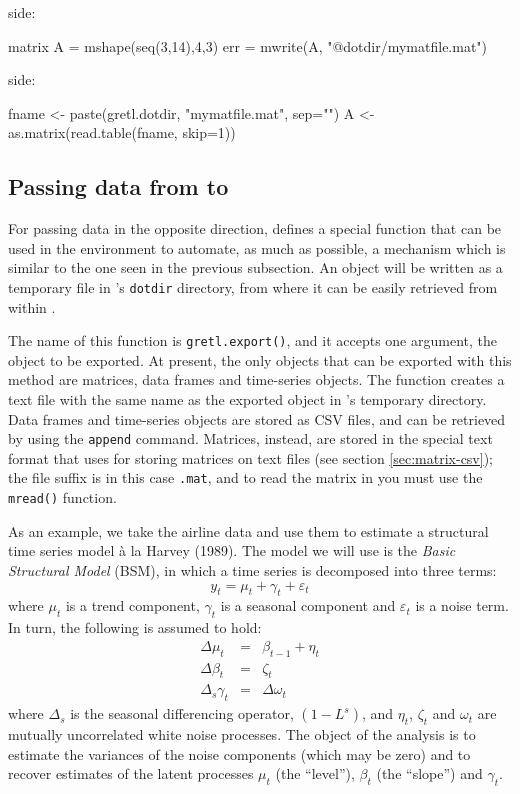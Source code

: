  side:
\begin{code}
  matrix A = mshape(seq(3,14),4,3)
  err = mwrite(A, "@dotdir/mymatfile.mat")
\end{code}
 side:
\begin{code}
  fname <- paste(gretl.dotdir, "mymatfile.mat", sep="")
  A <- as.matrix(read.table(fname, skip=1))
\end{code}

\subsection{Passing data from  to }
\label{sec:Rpassing-data}

For passing data in the opposite direction,  defines a
special function that can be used in the  environment to
automate, as much as possible, a mechanism which is similar to the one
seen in the previous subsection. An  object will be written as
a temporary file in 's \texttt{dotdir} directory, from
where it can be easily retrieved from within .

The name of this function is \texttt{gretl.export()}, and it accepts
one argument, the object to be exported. At present, the only objects
that can be exported with this method are matrices, data frames and
time-series objects. The function creates a text file with the same
name as the exported object in 's temporary directory. Data
frames and time-series objects are stored as CSV files, and can be
retrieved by using the \texttt{append} command. Matrices, instead, are
stored in the special text format that  uses for storing
matrices on text files (see section \ref{sec:matrix-csv}); the file
suffix is in this case \texttt{.mat}, and to read the matrix in
 you must use the \texttt{mread()} function.

As an example, we take the airline data and use them to estimate a
structural time series model \`a la Harvey (1989). The model we will 
use is the \emph{Basic Structural Model} (BSM), in which a time series
is decomposed into three terms:
\[
  y_t = \mu_t + \gamma_t + \varepsilon_t
\]
where $\mu_t$ is a trend component, $\gamma_t$ is a seasonal component
and $\varepsilon_t$ is a noise term. In turn, the following is assumed
to hold:
\begin{eqnarray*}
  \Delta \mu_t & = & \beta_{t-1} + \eta_t \\
  \Delta \beta_t & = & \zeta_t \\
  \Delta_s \gamma_t & = & \Delta \omega_t
\end{eqnarray*}
where $\Delta_s$ is the seasonal differencing operator, $(1-L^s)$, and
$\eta_t$, $\zeta_t$ and $\omega_t$ are mutually uncorrelated white
noise processes. The object of the analysis is to estimate the
variances of the noise components (which may be zero) and to recover
estimates of the latent processes $\mu_t$ (the ``level''), $\beta_t$
(the ``slope'') and $\gamma_t$.

